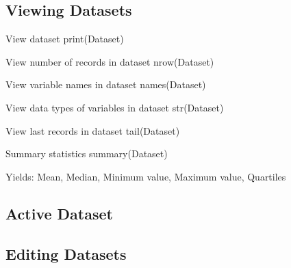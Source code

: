 \subsection{Viewing Datasets}

View dataset
print(Dataset)

View number of records in dataset
nrow(Dataset)

View variable names in dataset
names(Dataset)

View data types of variables in dataset
str(Dataset)

View last records in dataset
tail(Dataset)

Summary statistics
summary(Dataset)

Yields: Mean, Median, Minimum value, Maximum value, Quartiles

\subsection{Active Dataset}

\subsection{Editing Datasets}